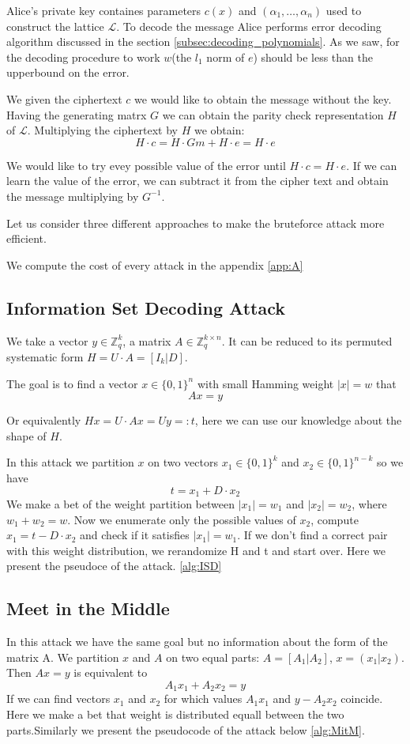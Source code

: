 \documentclass[12pt]{article}
\newcommand{\ZZ}{\mathbb{Z}}
\newcommand{\LL}{\mathcal{L}}
\begin{document}
Alice's private key containes parameters $c(x)$ and $(\alpha_1, \dots, \alpha_n)$ used to construct the lattice $\LL$. To decode the message Alice performs error decoding algorithm discussed in the section \ref{subsec:decoding_polynomials}. As we saw, for the decoding procedure to work $w$(the $l_1$ norm of $e$) should be less than the upperbound on the error.

We given the ciphertext $c$ we would like to obtain the message without the key. Having the generating matrx $G$ we can obtain the parity check representation $H$ of $\LL$. Multiplying the ciphertext by $H$ we obtain:
\[
    H \cdot c = H \cdot Gm + H \cdot e = H \cdot e
\]

We would like to try evey possible value of the error until $H \cdot c = H \cdot e$. If we can learn the value of the error, we can subtract it from the cipher text and obtain the message multiplying by $G^{-1}$.

Let us consider three different approaches to make the bruteforce attack more efficient.

We compute the cost of every attack in the appendix \ref{app:A}


\subsection{Information Set Decoding Attack}

We take a vector $y \in \ZZ_q^{k}$, a matrix $A \in \ZZ_q^{k \times n}$. It can be reduced to its permuted systematic form $H  = U \cdot A = [I_{k}|D]$.


The goal is to find a vector $x \in \{0,1\}^{n}$ with small Hamming weight $|x| = w$ that
\[
Ax = y
\]

Or equivalently $Hx = U\cdot Ax = Uy =: t$, here we can use our knowledge about the shape of $H$.

In this attack we partition $x$ on two vectors $x_1 \in \{0,1\}^{k}$ and  $x_2  \in \{0,1\}^{n-k}$ so we have
\[
t = x_1 + D \cdot x_2
\]
We make a bet of the weight partition between $|x_1| = w_1$ and $|x_2| = w_2$, where $w_1 + w_2 = w$. Now we enumerate only the possible values of $x_2$, compute $x_1 = t - D \cdot x_2$ and check if it satisfies $|x_1| = w_1$. If we don't find a correct pair with this weight distribution, we rerandomize H and t and start over. Here we present the pseudoce of the attack. \ref{alg:ISD}

\subsection{Meet in the Middle}
In this attack we have the same goal but no information about the form of the matrix A.
We partition $x$ and $A$ on two equal parts: $A = [A_1 | A_2]$, $x = (x_1 | x_2)$.
Then $Ax = y$ is equivalent to
\[
    A_1x_1 + A_2x_2 = y
\]
If we can find vectors $x_1$ and $x_2$ for which values $A_1x_1$ and $y - A_2x_2$ coincide. Here we make a bet that weight is distributed equall between the two parts.Similarly we present the pseudocode of the attack below \ref{alg:MitM}.
\end{document}
